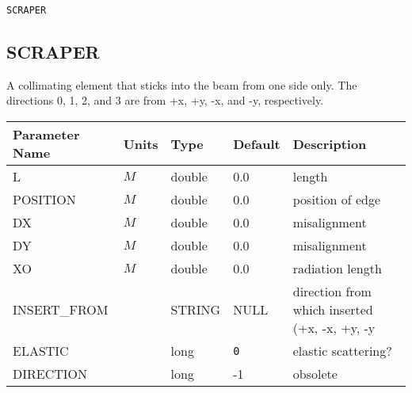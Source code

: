 \begin{latexonly}
\newpage
\begin{center}{\Large\verb|SCRAPER|}\end{center}
\end{latexonly}\subsection{SCRAPER}
A collimating element that sticks into the beam from one side only.  The
directions 0, 1, 2, and 3 are from +x, +y, -x, and -y, respectively.
\\
\begin{tabular}{|l|l|l|l|p{\descwidth}|} \hline
Parameter Name & Units & Type & Default & Description \\ \hline 
L & $M$ & double &  0.0 & length  \\ \hline 
POSITION & $M$ & double &  0.0 & position of edge  \\ \hline 
DX & $M$ & double &  0.0 & misalignment  \\ \hline 
DY & $M$ & double &  0.0 & misalignment  \\ \hline 
XO & $M$ & double &  0.0 & radiation length  \\ \hline 
INSERT\_FROM &  & STRING &   NULL            & direction from which inserted (+x, -x, +y, -y  \\ \hline 
ELASTIC &  & long &  \verb|0| & elastic scattering?  \\ \hline 
DIRECTION &  & long &   -1              & obsolete  \\ \hline 
\end{tabular}

